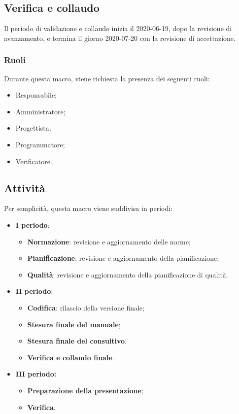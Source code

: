 \documentclass[../piano-di-progetto.tex]{subfiles}
\begin{document}
\subsection{Verifica e collaudo}
Il periodo di validazione e collaudo inizia il 2020-06-19, dopo la revisione di avanzamento, e termina il giorno 2020-07-20 con la revisione di accettazione. 

\subsubsection{Ruoli}
Durante questa macro, viene richiesta la presenza dei seguenti ruoli:
\begin{itemize}
    \item Responsabile;
    \item Amministratore;
    \item Progettista;
    \item Programmatore;
    \item Verificatore.
\end{itemize}

\subsection{Attività}
Per semplicità, questa macro viene suddivisa in periodi:

\begin{itemize}
    \item \textbf{I periodo}:
        \begin{itemize}
            \item \textbf{Normazione}: revisione e aggiornamento delle norme;
            \item \textbf{Pianificazione}: revisione e aggiornamento della pianificazione;
            \item \textbf{Qualità}: revisione e aggiornamento della pianificazione di qualità.
        \end{itemize}
    \item \textbf{II periodo}:
        \begin{itemize}
            \item \textbf{Codifica}: rilascio della versione finale;
            \item \textbf{Stesura finale del manuale};
            \item \textbf{Stesura finale del consultivo};
            \item \textbf{Verifica e collaudo finale}.
        \end{itemize}
    \item \textbf{III periodo:}
        \begin{itemize}
            \item \textbf{Preparazione della presentazione};
            \item \textbf{Verifica}.
        \end{itemize}
\end{itemize}
\end{document}
